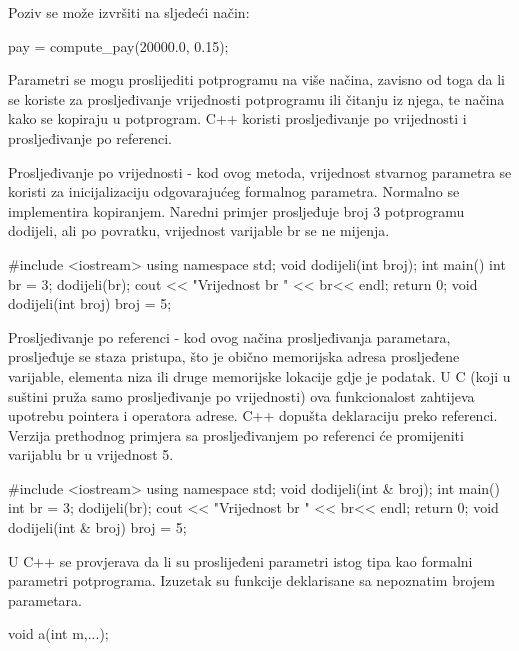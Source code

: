 \documentclass[11pt]{book}
\begin{document}
Poziv se može izvršiti na sljedeći način:

\begin{shortlisting}
  pay = compute_pay(20000.0, 0.15);
\end{shortlisting}

Parametri se mogu proslijediti potprogramu na više načina, zavisno od toga da li se koriste za prosljeđivanje vrijednosti potprogramu ili čitanju iz njega, te načina kako  se kopiraju u potprogram. C++ koristi prosljeđivanje po vrijednosti i prosljeđivanje po referenci.

Prosljeđivanje po vrijednosti - kod ovog metoda, vrijednost stvarnog parametra se koristi za inicijalizaciju odgovarajućeg formalnog parametra. Normalno se implementira kopiranjem. Naredni primjer prosljeđuje broj 3 potprogramu dodijeli, ali po povratku, vrijednost varijable br se ne mijenja.

\begin{shortlisting}
  #include <iostream>
  using namespace std;
  void dodijeli(int broj);
  int main()
    {
      int br = 3;
      dodijeli(br);
      cout << "Vrijednost br " << br<< endl;
      return 0;
    }
  void dodijeli(int broj)
    {
      broj = 5;
    }
\end{shortlisting}

Prosljeđivanje po referenci - kod ovog načina prosljeđivanja parametara, prosljeđuje se staza pristupa, što je obično memorijska adresa prosljeđene varijable, elementa niza ili druge memorijske lokacije gdje je podatak. U C (koji u suštini pruža samo prosljeđivanje po vrijednosti) ova funkcionalost zahtijeva upotrebu pointera i operatora adrese. C++ dopušta deklaraciju preko referenci. Verzija prethodnog primjera sa prosljeđivanjem po referenci će promijeniti varijablu br u vrijednost 5.

\begin{shortlisting}
  #include <iostream>
  using namespace std;
  void dodijeli(int & broj);
  int main()
    {
      int br = 3;
      dodijeli(br);
      cout << "Vrijednost br " << br<< endl;
      return 0;
    }
  void dodijeli(int & broj)
    {
      broj = 5;
    }
\end{shortlisting}


U C++ se provjerava da li su proslijeđeni parametri istog tipa kao formalni parametri potprograma. Izuzetak su funkcije deklarisane sa nepoznatim brojem parametara.

\begin{shortlisting}
  void a(int m,...);
\end{shortlisting}
\end{document}
